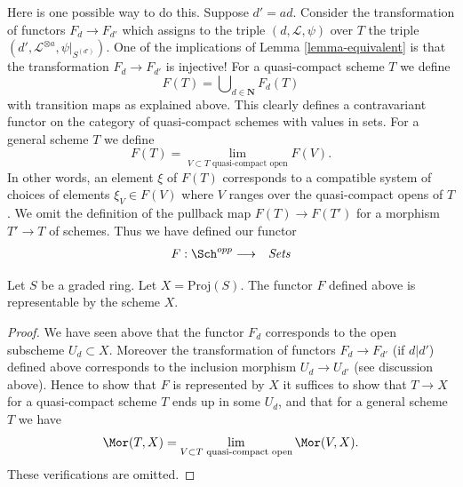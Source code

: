 \medskip\noindent
Here is one possible way to do this. Suppose $d' = ad$.
Consider the transformation of functors $F_d \to F_{d'}$
which assigns to the triple $(d, \mathcal{L}, \psi)$ over
$T$ the triple $(d', \mathcal{L}^{\otimes a}, \psi|_{S^{(d')}})$.
One of the implications of Lemma \ref{lemma-equivalent} is that the
transformation $F_d \to F_{d'}$ is injective!
For a quasi-compact scheme $T$ we define
$$
F(T) = \bigcup\nolimits_{d \in \mathbf{N}} F_d(T)
$$
with transition maps as explained above. This clearly defines a
contravariant functor on the category of quasi-compact schemes
with values in sets. For a general scheme
$T$ we define
$$
F(T)
=
\lim_{V \subset T\text{ quasi-compact open}} F(V).
$$
In other words, an element $\xi$ of $F(T)$ corresponds to a compatible system
of choices of elements $\xi_V \in F(V)$ where $V$ ranges over the
quasi-compact opens of $T$.
We omit the definition of the pullback map $F(T) \to F(T')$
for a morphism $T' \to T$ of schemes.
Thus we have defined our functor
\begin{eqnarray*}
F : \Sch^{opp} & \longrightarrow & \textit{Sets}
\end{eqnarray*}

\begin{lemma}
\label{lemma-proj-functor}
Let $S$ be a graded ring.
Let $X = \text{Proj}(S)$.
The functor $F$ defined above is representable by the scheme $X$.
\end{lemma}

\begin{proof}
We have seen above that the functor $F_d$ corresponds to the
open subscheme $U_d \subset X$. Moreover the transformation
of functors $F_d \to F_{d'}$ (if $d | d'$) defined above
corresponds to the inclusion morphism $U_d \to U_{d'}$
(see discussion above). Hence to show that $F$ is represented
by $X$ it suffices to show that $T \to X$ for a quasi-compact
scheme $T$ ends up in some $U_d$, and that for a general scheme
$T$ we have
$$
\Mor(T, X)
=
\lim_{V \subset T\text{ quasi-compact open}} \Mor(V, X).
$$
These verifications are omitted.
\end{proof}







